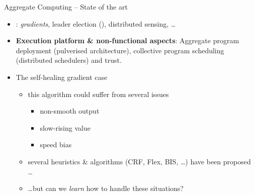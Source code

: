 \documentclass[9pt, aspectratio=169, handout]{beamer}
\begin{document}
\begin{frame}{Aggregate Computing -- State of the art}
\begin{card}
  \begin{itemize}
    \item {}: \emph{gradients}, leader election (), distributed sensing, \dots
    \item \textbf{Execution platform \& non-functional aspects}: Aggregate program deployment (pulverised architecture), collective program scheduling (distributed schedulers) and trust.
  \end{itemize}
\end{card}
\begin{alarm}[Challenges]
  \begin{itemize}
    \item The self-healing gradient case
    \begin{itemize}
      \item this algorithm could suffer from several issues~\cite{DBLP:conf/saso/AudritoCDV17}
      \begin{itemize}
        \item[\faArrowRight] non-smooth output
        \item[\faArrowRight] slow-rising value
        \item[\faArrowRight] speed bias
      \end{itemize}
      \item several heuristics \& algorithms (CRF, Flex, BIS, \dots) have been proposed \dots
      \item \dots but can we \emph{learn} how to handle these situations?
    \end{itemize}
  \end{itemize}
\end{alarm}
\end{frame}
\end{document}
